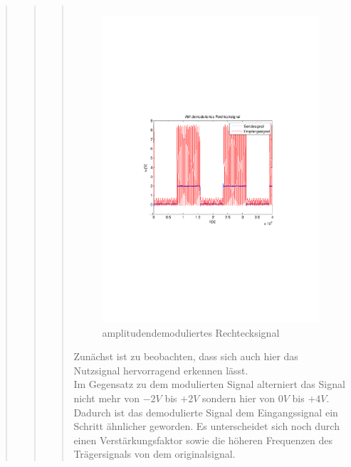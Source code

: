 \begin{quote}
\begin{quote}
\begin{quote}
\begin{center}
\begin{tabular}{ll}
                \end{tabular}
                \end{center}
                
                 \begin{figure}[H] \centering
                        \includegraphics[scale=0.5, trim = 2cm 6.5cm 1.5cm 8.5cm,
                        clip]{./Bilder/synchDemod_rechteck}
                            \caption{amplitudendemoduliertes Rechtecksignal}
                    \end{figure}
                    
                    Zunächst ist zu beobachten, dass sich auch hier das Nutzsignal hervorragend
                    erkennen lässt.\\
                    Im Gegensatz zu dem modulierten Signal alterniert das Signal nicht mehr von $-2V$ bis $+2V$ sondern
                    hier von $0V$ bis $+4V$. Dadurch ist das demodulierte Signal dem Eingangssignal ein Schritt
                    ähnlicher geworden. Es unterscheidet sich noch durch einen Verstärkungsfaktor sowie die höheren
                    Frequenzen des Trägersignals von dem originalsignal.\vspace{1em}
                    

\end{quote}
\end{quote}
\end{quote}
